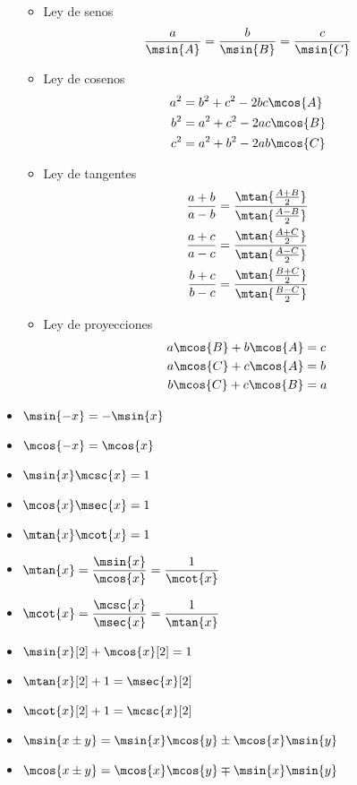 \begin{itemize}
\begin{figure}[H]
\begin{tikzpicture}[x=0.75pt,y=0.75pt,yscale=-1,xscale=1]
			
		\end{tikzpicture}
	\end{figure}
	\begin{itemize}
		\item Ley de senos
		\[ \dfrac{a}{\msin{A}} =\dfrac{b}{\msin{B}} =\dfrac{c}{\msin{C}} \]
		\item Ley de cosenos
		\begin{align*}
			a^{2} &= b^{2} + c^{2} - 2bc\mcos{A} \\
			b^{2} &= a^{2} + c^{2} - 2ac\mcos{B} \\
			c^{2} &= a^{2} + b^{2} - 2ab\mcos{C} 
		\end{align*}
		\item Ley de tangentes
		\begin{align*}
			\dfrac{a + b}{a - b} &=\dfrac{\mtan{\frac{A + B}{2}}}{\mtan{\frac{A - B}{2}}} \\
			\dfrac{a + c}{a - c} &=\dfrac{\mtan{\frac{A + C}{2}}}{\mtan{\frac{A - C}{2}}} \\
			\dfrac{b + c}{b - c} &=\dfrac{\mtan{\frac{B + C}{2}}}{\mtan{\frac{B - C}{2}}}
		\end{align*}
		\item Ley de proyecciones
		\begin{align*}
			a\mcos{B} + b\mcos{A} &= c \\
			a\mcos{C} + c\mcos{A} &= b \\
			b\mcos{C} + c\mcos{B} &= a
		\end{align*}
	\end{itemize}
	\item $\ds\msin{-x} =-\msin{x}$
	\item $\ds\mcos{-x} =\mcos{x}$
	\item $\ds\msin{x}\mcsc{x} = 1$
	\item $\ds\mcos{x}\msec{x} = 1$
	\item $\ds\mtan{x}\mcot{x} = 1$
	\item $\ds\mtan{x} =\dfrac{\msin{x}}{\mcos{x}} =\dfrac{1}{\mcot{x}}$
	\item $\ds\mcot{x} =\dfrac{\mcsc{x}}{\msec{x}} =\dfrac{1}{\mtan{x}}$
	\item $\ds\msin{x}[2] +\mcos{x}[2] = 1$
	\item $\ds\mtan{x}[2] + 1 =\msec{x}[2]$
	\item $\ds\mcot{x}[2] + 1 =\mcsc{x}[2]$
	\item $\ds\msin{x\pm y} =\msin{x}\mcos{y}\pm\mcos{x}\msin{y}$
	\item $\ds\mcos{x\pm y} =\mcos{x}\mcos{y}\mp\msin{x}\msin{y}$

\end{itemize}
